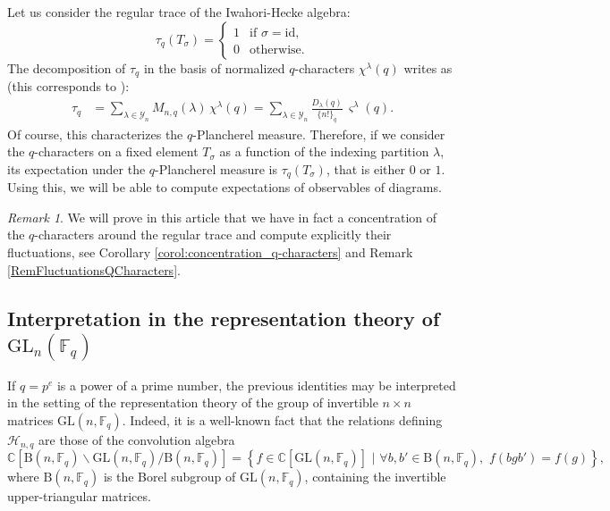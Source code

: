 \documentclass[10pt]{amsart}
\theoremstyle{remark}
\newtheorem{remark}{Remark}
\newcommand{\C}{\mathbb{C}}
\newcommand{\IH}{\mathscr{H}}
\newcommand{\young}{\mathscr{Y}}
\newcommand{\GL}{\mathrm{GL}}
\newcommand{\GB}{\mathrm{B}}
\newcommand{\For}{\mathbb{F}}
\begin{document}
Let us consider the regular trace of the Iwahori-Hecke algebra:
$$\tau_q(T_\sigma)=\begin{cases}
                  1&\text{if }\sigma=\mathrm{id},\\
                 0&\text{otherwise}.
                 \end{cases}
$$
The decomposition of $\tau_q$ in the basis of normalized $q$-characters $\chi^\lambda(q)$ writes as
(this corresponds to \cite[equation (16)]{Stra08}):
\begin{align}
\tau_q &= \sum_{\lambda \in \young_n} M_{n,q}(\lambda)\,\chi^\lambda(q)=\sum_{\lambda\in \young_n} \frac{D_\lambda(q)}{\{n!\}_q}\,\varsigma^\lambda(q). \label{eq:tau_qPlancherel}
\end{align}
Of course, this characterizes the $q$-Plancherel measure. Therefore, if we consider the $q$-characters on a fixed element $T_\sigma$ as a function of the indexing partition $\lambda$, its expectation  under the $q$-Plancherel measure is $\tau_q(T_\sigma)$, that is either $0$ or $1$. Using this, we will be able to compute expectations of observables of diagrams. 

\begin{remark} We will prove in this article that we have in fact a concentration of the $q$-characters around the regular trace and compute explicitly their fluctuations, see Corollary \ref{corol:concentration_q-characters} and Remark \ref{RemFluctuationsQCharacters}.\bigskip
\end{remark}





\subsection{Interpretation in the representation theory of $\GL_n(\For_q)$}\label{subsect:algebraic_int_regular_trace}
If $q=p^e$ is a power of a prime number, the previous identities may be interpreted in the setting of the representation theory of the group of invertible $n \times n$ matrices $\GL(n,\For_q)$. Indeed, it is a well-known fact \cite{Iwa64} that the relations defining $\IH_{n,q}$ are those of the convolution algebra
$$\C[\GB(n,\For_q) \backslash \GL(n,\For_q)/ \GB(n,\For_q)] = \left\{f \in \C[\GL(n,\For_q)]\,\,|\,\,\forall b,b' \in \GB(n,\For_q),\,\, f(bgb')=f(g) \right\},$$
where $\GB(n,\For_q)$ is the Borel subgroup of $\GL(n,\For_q)$, containing the invertible upper-triangular matrices.\bigskip
\end{document}
